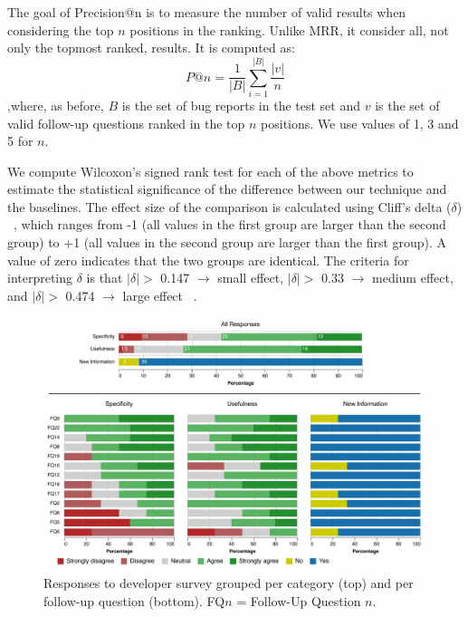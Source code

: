 The goal of Precision@n is to measure the number of valid results when considering the top $n$ positions in the ranking. Unlike MRR, it consider all, not only the topmost ranked, results. It is computed as: $$P@n = \frac{1}{|B|} \sum_{i=1}^{|B|} \frac{|v|}{n}$$ ,where, as before, $B$ is the set of bug reports in the test set and $v$ is the set of valid follow-up questions ranked in the top $n$ positions. We use values of 1, 3 and 5 for $n$.

We compute Wilcoxon's signed rank test for each of the above metrics to estimate the statistical significance of the difference between our technique \evpi and the baselines. The effect size of the comparison is calculated using Cliff's delta ($\delta$) ~\cite{cliff1993dominance}, which ranges from -1 (all values in the first group are larger than the second group) to +1 (all values in the second group are larger than the first group). A value of zero indicates that the two groups are identical. The criteria for interpreting $\delta$ is that $|\delta| >$ 0.147 $\rightarrow$ small effect, $|\delta| >$ 0.33 $\rightarrow$ medium effect, and $|\delta| >$ 0.474 $\rightarrow$ large effect ~\cite{romano2006appropriate}.

\begin{figure}[t]
\centering
\includegraphics[width=0.95\linewidth]{figures/viz_group.pdf}
\caption{Responses to developer survey grouped per category (top) and per follow-up question (bottom). FQ$n$ = Follow-Up Question $n$.}
\label{fig:survey}
\end{figure}

